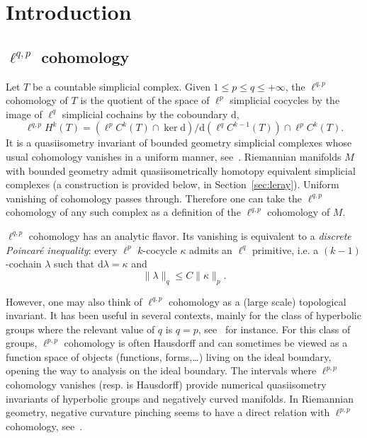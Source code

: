 \documentclass[11pt]{article}
\theoremstyle{definition}
\numberwithin{equation}{section}
\numberwithin{figure}{section}
\numberwithin{table}{section}
\newcommand{\dd}{\mathrm{d}}
\begin{document}
\section{Introduction}

\subsection{\texorpdfstring{$\ell^{q,p}$}{ell(q,p)} cohomology}

Let $T$ be a countable simplicial complex. Given $1\leq p\leq q\leq +\infty$, the $\ell^{q,p}$ cohomology of $T$ is the quotient of the space of $\ell^p$ simplicial cocycles by the image of $\ell^q$ simplicial cochains by the coboundary $\dd$,
\[
\ell^{q,p}H^k(T)=(\ell^p C^k(T)\cap \ker \dd)/\dd(\ell^q C^{k-1}(T)) \cap \ell^p C^k(T).
\]
It is a quasiisometry invariant of bounded geometry simplicial complexes whose usual cohomology vanishes in a uniform manner, see~\cite{Bourdon-Pajot,Elek,Genton,Gromov,Pansu2}. Riemannian manifolds $M$ with bounded geometry admit quasiisometrically homotopy equivalent simplicial complexes (a construction is provided below, in Section~\ref{sec:leray}). Uniform vanishing of cohomology passes through. Therefore one can take the $\ell^{q,p}$ cohomology of any such complex as a definition of the $\ell^{q,p}$ cohomology of $M$.

$\ell^{q,p}$ cohomology has an analytic flavor. Its vanishing is equivalent to a \emph{discrete Poincar\'e inequality}: every $\ell^p$ $k$-cocycle $\kappa$ admits an $\ell^q$ primitive, i.e. a $(k-1)$-cochain $\lambda$ such that $\dd\lambda=\kappa$ and
\begin{equation}\label{eq:1}
\|\lambda\|_q \leq C \|\kappa\|_p.
\end{equation}

However, one may also think of $\ell^{q,p}$ cohomology as a (large scale) topological invariant. It has been useful in several contexts, mainly for the class of hyperbolic groups where the relevant value of $q$ is $q=p$, see~\cite{Bourdon-Kleiner,Bourdon-Pajot, Cornulier-Tessera,Drutu-Mackay} for instance. For this class of groups, $\ell^{p,p}$ cohomology is often Hausdorff and can sometimes be viewed as a function space of objects (functions, forms,\dots) living on the ideal boundary, opening the way to analysis on the ideal boundary. The intervals where $\ell^{p,p}$ cohomology vanishes (resp. is Hausdorff) provide numerical quasiisometry invariants of hyperbolic groups and negatively curved manifolds. In Riemannian geometry, negative curvature pinching seems to have a direct relation with $\ell^{p,p}$ cohomology, see~\cite{Pansu4}.
\end{document}
